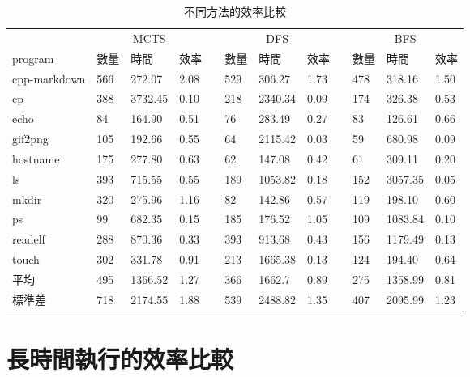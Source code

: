 \documentclass[12pt,a4paper,oneside]{book}
\begin{document}
\begin{table}[htbp]
\centering
\caption{不同方法的效率比較}
\label{testMethod}
\begin{tabular}{@{}llllllllllll@{}} \toprule
             & \multicolumn{3}{c}{MCTS} & \phantom{abc} & \multicolumn{3}{c}{DFS} & \phantom{abc} & \multicolumn{3}{c}{BFS} \\ \cmidrule{2-4} \cmidrule{6-8} \cmidrule{10-12}
program      & 數量   & 時間   & 效率   & & 數量   & 時間   & 效率   & & 數量    & 時間   & 效率      \\ \midrule
cpp-markdown & 566    & 272.07 & 2.08 & & 529    & 306.27& 1.73  & & 478     & 318.16 & 1.50   \\
cp           & 388    & 3732.45& 0.10 & & 218    &2340.34& 0.09  & & 174     & 326.38 & 0.53   \\
echo         &  84    & 164.90 & 0.51 & &  76    & 283.49& 0.27  & &  83     & 126.61 & 0.66   \\
gif2png      & 105    & 192.66 & 0.55 & &  64    &2115.42& 0.03  & &  59     & 680.98 & 0.09   \\ 
hostname     & 175    & 277.80 & 0.63 & &  62    & 147.08& 0.42  & &  61     & 309.11 & 0.20   \\
ls           & 393    & 715.55 & 0.55 & & 189    &1053.82& 0.18  & & 152     &3057.35 & 0.05   \\
mkdir        & 320    & 275.96 & 1.16 & &  82    & 142.86& 0.57  & & 119     & 198.10 & 0.60   \\
ps           &  99    & 682.35 & 0.15 & & 185    & 176.52& 1.05  & & 109     &1083.84 & 0.10   \\
readelf      & 288    & 870.36 & 0.33 & & 393    & 913.68& 0.43  & & 156     &1179.49 & 0.13   \\
touch        & 302    & 331.78 & 0.91 & & 213    &1665.38& 0.13  & & 124     & 194.40 & 0.64   \\ \hline
平均          & 495    &1366.52 & 1.27 & & 366    & 1662.7& 0.89  & & 275     & 1358.99 & 0.81 \\
標準差        & 718    &2174.55 & 1.88 & & 539    & 2488.82& 1.35 & & 407     & 2095.99 & 1.23 \\ \bottomrule
\end{tabular}
\end{table}

\section{長時間執行的效率比較}
\end{document}
